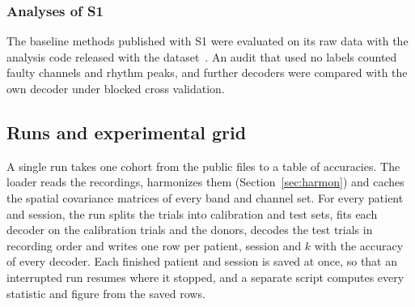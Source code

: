 \documentclass{ieeeaccess}
\begin{document}
\subsubsection{Analyses of S1} The baseline methods published with S1 were evaluated on its raw data with the analysis code released with the dataset~\cite{liu2024}. An audit that used no labels counted faulty channels and rhythm peaks, and further decoders were compared with the own decoder under blocked cross validation.

\subsection{Runs and experimental grid}\label{sec:repro}

A single run takes one cohort from the public files to a table of accuracies. The loader reads the recordings, harmonizes them (Section~\ref{sec:harmon}) and caches the spatial covariance matrices of every band and channel set. For every patient and session, the run splits the trials into calibration and test sets, fits each decoder on the calibration trials and the donors, decodes the test trials in recording order and writes one row per patient, session and $k$ with the accuracy of every decoder. Each finished patient and session is saved at once, so that an interrupted run resumes where it stopped, and a separate script computes every statistic and figure from the saved rows.
\end{document}
